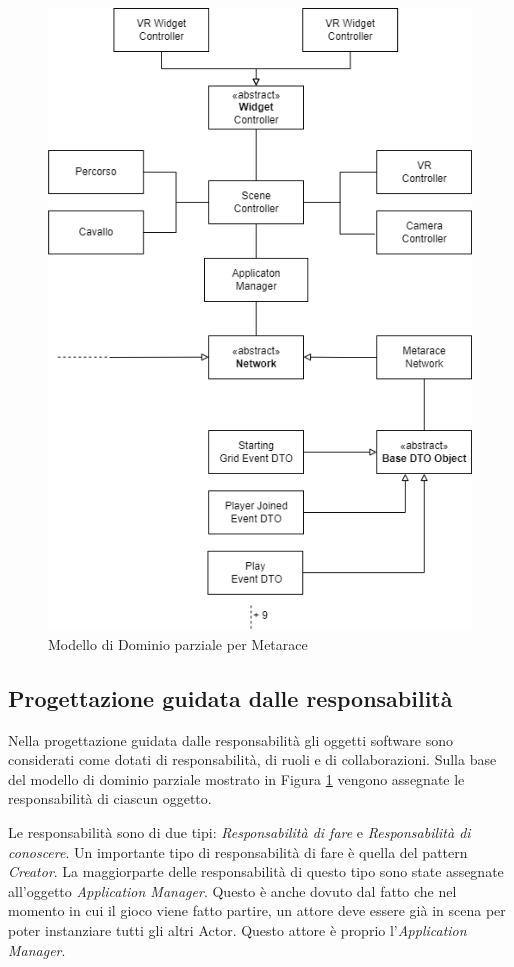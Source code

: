 \begin{figure}[!ht]
    \centering
    \includegraphics[width=12cm]{figure/Modello_di_Dominio_Metarace.drawio.png}
    \caption{Modello di Dominio parziale per Metarace}
    \label{img:Dominio}
\end{figure}

    \subsection{Progettazione guidata dalle responsabilità}

    Nella progettazione guidata dalle responsabilità gli oggetti software sono considerati come dotati di responsabilità, di ruoli e di collaborazioni.
    Sulla base del modello di dominio  parziale mostrato in Figura \ref{img:Dominio} vengono assegnate le responsabilità di ciascun oggetto.

    Le responsabilità sono di due tipi: \textit{Responsabilità di fare} e \textit{Responsabilità di conoscere}.
    Un importante tipo di responsabilità di fare è quella del pattern \textit{Creator}.
    La maggiorparte delle responsabilità di questo tipo sono state assegnate all'oggetto \textit{Application Manager}.  
    Questo è anche dovuto dal fatto che nel momento in cui il gioco viene fatto partire, un attore deve essere già in scena per poter instanziare tutti gli altri Actor.
    Questo attore è proprio l'\textit{Application Manager}.

